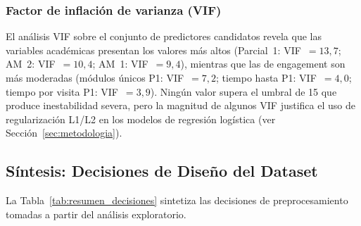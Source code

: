 \subsubsection{Factor de inflación de varianza (VIF)}
\label{sssec:vif}

El análisis VIF sobre el conjunto de predictores candidatos
revela que las variables académicas presentan los valores más
altos (Parcial~1: VIF~$= 13{,}7$; AM~2: VIF~$= 10{,}4$;
AM~1: VIF~$= 9{,}4$), mientras que las de engagement son más
moderadas (módulos únicos P1: VIF~$= 7{,}2$;
tiempo hasta P1: VIF~$= 4{,}0$;
tiempo por visita P1: VIF~$= 3{,}9$). Ningún valor supera el
umbral de 15 que produce inestabilidad severa, pero la magnitud
de algunos VIF justifica el uso de regularización L1/L2 en los
modelos de regresión logística (ver Sección~\ref{sec:metodologia}).

\subsection{Síntesis: Decisiones de Diseño del Dataset}
\label{subsec:sintesis_datos}

La Tabla~\ref{tab:resumen_decisiones} sintetiza las decisiones
de preprocesamiento tomadas a partir del análisis exploratorio.

